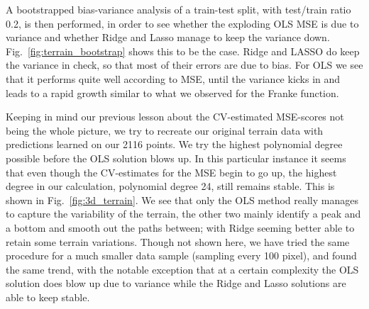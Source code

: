\documentclass[reprint, english, nofootinbib]{revtex4-2}
\begin{document}
A bootstrapped bias-variance analysis of a train-test split, with test/train ratio 0.2, is then performed, in order to see whether the exploding OLS MSE is due to variance and whether Ridge and Lasso manage to keep the variance down. Fig.~\ref{fig:terrain_bootstrap} shows this to be the case. Ridge and LASSO do keep the variance in check, so that most of their errors are due to bias. For OLS we see that it performs quite well according to MSE, until the variance kicks in and leads to a rapid growth similar to what we observed for the Franke function.





Keeping in mind our previous lesson about the CV-estimated MSE-scores not being the whole picture, we try to recreate our original terrain data with predictions learned on our 2116 points. We try the highest polynomial degree possible before the OLS solution blows up. In this particular instance it seems that even though the CV-estimates for the MSE begin to go up, the highest degree in our calculation, polynomial degree 24, still remains stable. This is shown in Fig.~\ref{fig:3d_terrain}. We see that only the OLS method really manages to capture the variability of the terrain, the other two mainly identify a peak and a bottom and smooth out the paths between; with Ridge seeming better able to retain some terrain variations. Though not shown here, we have tried the same procedure for a much smaller data sample (sampling every 100 pixel), and found the same trend, with the notable exception that at a certain complexity the OLS solution does blow up due to variance while the Ridge and Lasso solutions are able to keep stable.
\end{document}

